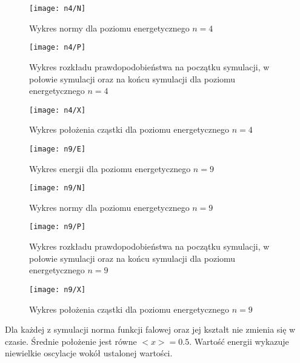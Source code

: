 \documentclass[a4paper,10pt]{article}
\begin{document}
	\begin{figure}[h]
	    \centering
	    \texttt{[image: n4/N]}
	    \caption{Wykres normy dla poziomu energetycznego $n = 4$}
		\label{n4n}
	\end{figure}

	\begin{figure}[h]
	    \centering
	    \texttt{[image: n4/P]}
	    \caption{Wykres rozkładu prawdopodobieństwa na początku symulacji, w połowie symulacji oraz na końcu symulacji dla poziomu energetycznego $n = 4$}
		\label{n4p}
	\end{figure}

	\begin{figure}[h]
	    \centering
	    \texttt{[image: n4/X]}
	    \caption{Wykres położenia cząstki dla poziomu energetycznego $n = 4$}
		\label{n4x}
	\end{figure}

	\begin{figure}[h]
	    \centering
	    \texttt{[image: n9/E]}
	    \caption{Wykres energii dla poziomu energetycznego $n = 9$}
		\label{n9e}
	\end{figure}		

	\begin{figure}[h]
	    \centering
	    \texttt{[image: n9/N]}
	    \caption{Wykres normy dla poziomu energetycznego $n = 9$}
		\label{n9n}
	\end{figure}

	\begin{figure}[h]
	    \centering
	    \texttt{[image: n9/P]}
	    \caption{Wykres rozkładu prawdopodobieństwa na początku symulacji, w połowie symulacji oraz na końcu symulacji dla poziomu energetycznego $n = 9$}
		\label{n9p}
	\end{figure}

	\begin{figure}[h]
	    \centering
	    \texttt{[image: n9/X]}
	    \caption{Wykres położenia cząstki dla poziomu energetycznego $n = 9$}
		\label{n9x}
	\end{figure}

	Dla każdej z symulacji norma funkcji falowej oraz jej kształt nie zmienia się w czasie. Średnie położenie jest równe $<x>=0.5$. Wartość energii wykazuje niewielkie oscylacje wokół ustalonej wartości.
	\clearpage
\end{document}
